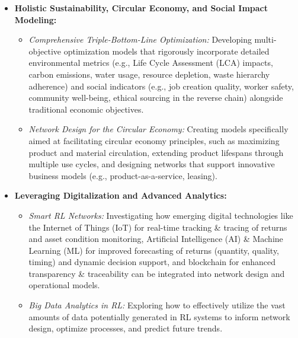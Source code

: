 \begin{itemize}[label=, leftmargin=2mm]
    \item \textbf{Holistic Sustainability, Circular Economy, and Social Impact Modeling:}
        \begin{itemize}
            \item \textit{Comprehensive Triple-Bottom-Line Optimization:} Developing multi-objective optimization models that rigorously incorporate detailed environmental metrics (e.g., Life Cycle Assessment (LCA) impacts, carbon emissions, water usage, resource depletion, waste hierarchy adherence) and social indicators (e.g., job creation quality, worker safety, community well-being, ethical sourcing in the reverse chain) alongside traditional economic objectives.
            \item \textit{Network Design for the Circular Economy:} Creating models specifically aimed at facilitating circular economy principles, such as maximizing product and material circulation, extending product lifespans through multiple use cycles, and designing networks that support innovative business models (e.g., product-as-a-service, leasing).
        \end{itemize}

    \item \textbf{Leveraging Digitalization and Advanced Analytics:}
        \begin{itemize}
            \item \textit{Smart RL Networks:} Investigating how emerging digital technologies like the Internet of Things (IoT) for real-time tracking \& tracing of returns and asset condition monitoring, Artificial Intelligence (AI) \& Machine Learning (ML) for improved forecasting of returns (quantity, quality, timing) and dynamic decision support, and blockchain for enhanced transparency \& traceability can be integrated into network design and operational models.
            \item \textit{Big Data Analytics in RL:} Exploring how to effectively utilize the vast amounts of data potentially generated in RL systems to inform network design, optimize processes, and predict future trends.
        \end{itemize}


\end{itemize}
